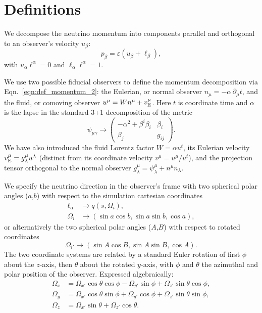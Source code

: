 \documentclass[aps,floatfix,prd,superscriptaddress,twocolumn]{revtex4-1}
\begin{document}
\appendix

\section{Definitions}
\label{sec:definitions}
We decompose the neutrino momentum into components parallel and orthogonal to
an observer's velocity $u_\beta$:
\begin{equation}
  \label{eqn:def_momentum_2}
  p_\beta = \varepsilon (u_\beta + \ell_\beta),
\end{equation}
with $u_\alpha\ell^\alpha=0$ and $\ell_\alpha\ell^\alpha=1$.

We use two possible fiducial observers to define the momentum
decomposition via Eqn.~\ref{eqn:def_momentum_2}: the Eulerian,
or normal observer $n_\mu=-\alpha \,\partial_\mu t$,
and the fluid, or comoving observer
$u^\mu=Wn^\mu+v_{\rm E}^\mu$.
Here $t$ is coordinate time and $\alpha$ is the lapse
in the standard 3+1 decomposition of the metric
\begin{equation}
  \label{eqn:adm_metric}
  \psi_{\mu\gamma} \rightarrow
  \left(
  \begin{matrix}
    -\alpha^2 + \beta^i \beta_i  & \beta_i \\
    \beta_j                      & g_{ij}
  \end{matrix}
  \right).
\end{equation}
We have also introduced
the fluid Lorentz factor $W=\alpha u^t$,
its Eulerian velocity $v_{\rm E}^\mu=g^\mu_\lambda u^\lambda$
(distinct from its coordinate velocity $v^\mu=u^\mu/u^t$),
and the projection tensor orthogonal to the normal observer
$g^\mu_\lambda=\psi^\mu_\lambda+n^\mu n_\lambda$.

We specify the neutrino direction in the observer's frame
with two spherical polar angles
($a$,$b$) with respect to the simulation cartesian coordinates
\begin{align}
  \ell_\alpha &\rightarrow q(s,\Omega_i), \\
  \Omega_i &\rightarrow (\sin a \cos b,\sin a\sin b,\cos a),
\end{align}
or alternatively the two spherical polar angles
($A$,$B$) with respect to rotated coordinates
\begin{equation}
  \label{eqn:def_direction_primed_2}
  \Omega_{i'} \rightarrow  (\sin A \cos B,\sin A\sin B,\cos A).
\end{equation}
The two coordinate systems are related by a standard Euler rotation of first
$\phi$ about the $z$-axis, then $\theta$ about the rotated $y$-axis,
with $\phi$ and $\theta$ the azimuthal and polar position of the observer.
Expressed algebraically:
\begin{align}
  \label{eqn:rotation_connection}
  \Omega_x &= \Omega_{x'}\cos\theta\cos\phi-\Omega_{y'}\sin\phi+\Omega_{z'}\sin\theta\cos\phi,\nonumber\\
  \Omega_y &= \Omega_{x'}\cos\theta\sin\phi+\Omega_{y'}\cos\phi+\Omega_{z'}\sin\theta\sin\phi,\nonumber\\
  \Omega_z &= \Omega_{x'}\sin\theta+\Omega_{z'}\cos\theta.
\end{align}
\end{document}
